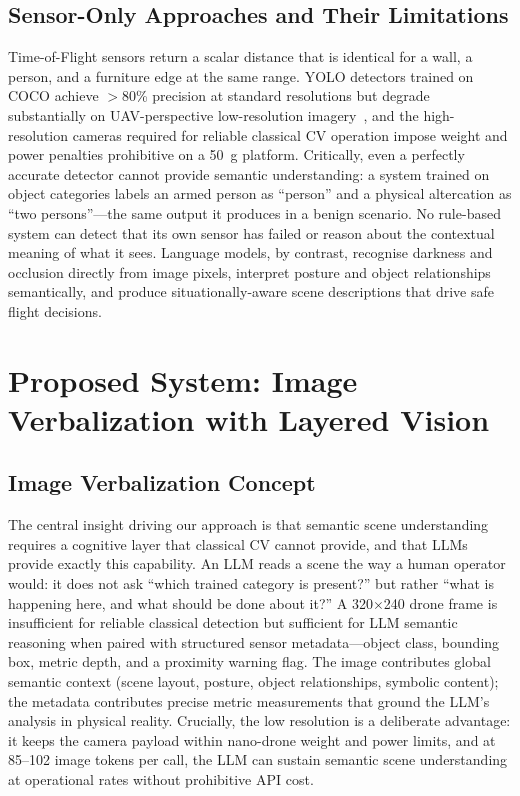 \documentclass[journal]{IEEEtran}
\begin{document}
\subsection{Sensor-Only Approaches and Their Limitations}

Time-of-Flight sensors return a scalar distance that is identical for a
wall, a person, and a furniture edge at the same range.
YOLO detectors trained on COCO achieve $>$80\% precision at standard
resolutions but degrade substantially on UAV-perspective low-resolution
imagery~\cite{kim2024yoloihd}, and the high-resolution cameras required
for reliable classical CV operation impose weight and power penalties
prohibitive on a \SI{50}{\gram} platform.
Critically, even a perfectly accurate detector cannot provide semantic
understanding: a system trained on object categories labels an armed person
as ``person'' and a physical altercation as ``two persons''---the same output
it produces in a benign scenario.
No rule-based system can detect that its own sensor has failed or reason
about the contextual meaning of what it sees.
Language models, by contrast, recognise darkness and occlusion directly from
image pixels, interpret posture and object relationships semantically, and
produce situationally-aware scene descriptions that drive safe flight
decisions.


\section{Proposed System: Image Verbalization with Layered Vision}
\label{sec:system}

\subsection{Image Verbalization Concept}

The central insight driving our approach is that semantic scene understanding
requires a cognitive layer that classical CV cannot provide, and that LLMs
provide exactly this capability.
An LLM reads a scene the way a human operator would: it does not ask ``which
trained category is present?'' but rather ``what is happening here, and what
should be done about it?''
A 320$\times$240 drone frame is insufficient for reliable classical detection
but sufficient for LLM semantic reasoning when paired with structured sensor
metadata---object class, bounding box, metric depth, and a proximity warning
flag.
The image contributes global semantic context (scene layout, posture, object
relationships, symbolic content); the metadata contributes precise metric
measurements that ground the LLM's analysis in physical reality.
Crucially, the low resolution is a deliberate advantage: it keeps the camera
payload within nano-drone weight and power limits, and at 85--102 image tokens
per call, the LLM can sustain semantic scene understanding at operational
rates without prohibitive API cost.
\end{document}
